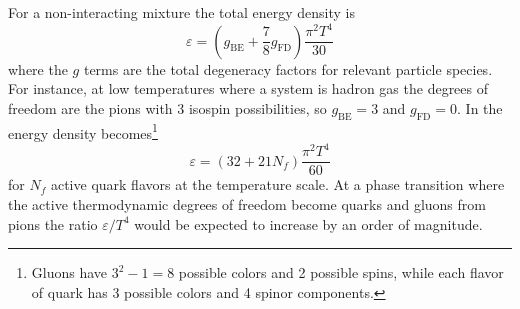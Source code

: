 For a non-interacting mixture the total energy density is
\begin{equation}
\varepsilon = \left( g_\textrm{BE} + \frac{7}{8} g_\textrm{FD} \right) \frac{\pi^2 T^4}{30}
\end{equation}
where the $g$ terms are the total degeneracy factors for relevant particle species.
For instance, at low temperatures where a system is hadron gas the degrees of freedom are the pions with 3 isospin possibilities, so $g_\textrm{BE} = 3$ and $g_\textrm{FD} = 0$.
In \qcd the energy density becomes\footnote{Gluons have $3^2 - 1 = 8$ possible colors and 2 possible spins, while each flavor of quark has 3 possible colors and 4 spinor components.}
\begin{equation}
  \label{eq:qcd_energy}
\varepsilon = \left( 32 + 21 N_f \right) \frac{\pi^2 T^4}{60}
\end{equation}
for $N_f$ active quark flavors at the temperature scale.
At a phase transition where the active thermodynamic degrees of freedom become quarks and gluons from pions the ratio $\varepsilon/T^4$ would be expected to increase by an order of magnitude.

